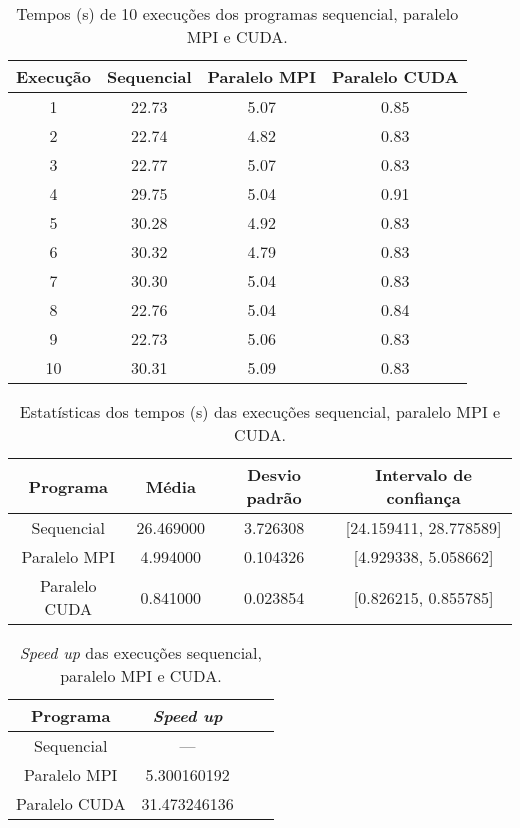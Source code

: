 \begin{table}[h]
\begin{center}
	\begin{tabular}{|c||c|c|c|} 
		\hline
		\textbf{Execução} & \textbf{Sequencial} & \textbf{Paralelo MPI} & \textbf{Paralelo CUDA}\\
		\hline
		1  & 22.73 & 5.07 & 0.85 \\
		2  & 22.74 & 4.82 & 0.83 \\
		3  & 22.77 & 5.07 & 0.83 \\
		4  & 29.75 & 5.04 & 0.91 \\
		5  & 30.28 & 4.92 & 0.83 \\
		6  & 30.32 & 4.79 & 0.83 \\
		7  & 30.30 & 5.04 & 0.83 \\
		8  & 22.76 & 5.04 & 0.84 \\
		9  & 22.73 & 5.06 & 0.83 \\
		10 & 30.31 & 5.09 & 0.83 \\
		\hline
	\end{tabular}
	\caption{Tempos (s) de 10 execuções dos programas sequencial, paralelo MPI e CUDA. \label{tab:tempos}}
\end{center}
\end{table}

\begin{table}[h]
\begin{center}
	\begin{tabular}{|c||c|c|c|} 
		\hline
		\textbf{Programa} & \textbf{Média} & \textbf{Desvio padrão} & \textbf{Intervalo de confiança}\\
		\hline
		Sequencial    & 26.469000 & 3.726308 & [24.159411, 28.778589] \\
		Paralelo MPI  & 4.994000  & 0.104326 & [4.929338, 5.058662] \\
		Paralelo CUDA & 0.841000  & 0.023854 & [0.826215, 0.855785] \\
		\hline
	\end{tabular}
	\caption{Estatísticas dos tempos (s) das execuções sequencial, paralelo MPI e CUDA. \label{tab:stats}}
\end{center}
\end{table}

\begin{table}[h]
\begin{center}
	\begin{tabular}{|c||c|c|c|} 
		\hline
		\textbf{Programa} & \textit{\textbf{Speed up}}\\
		\hline
		Sequencial    & --- \\
		Paralelo MPI  & 5.300160192 \\
		Paralelo CUDA & 31.473246136 \\
		\hline
	\end{tabular}
	\caption{\textit{Speed up} das execuções sequencial, paralelo MPI e CUDA. \label{tab:speedup}}
\end{center}
\end{table}

